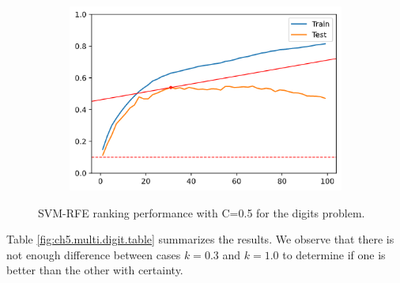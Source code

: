 \begin{figure}[h]
\begin{subfigure}[b]{0.4\linewidth}
    \end{subfigure}
    \begin{subfigure}[b]{0.4\linewidth}
        \includegraphics[width=\linewidth]{img/ch5/multi/w-coef.png}
    \end{subfigure}
    \caption[Multi-class criteria: Digits comparison]{SVM-RFE ranking performance with C=0.5 for the digits problem.}
    \label{fig:ch5.multi.digit.plot}
\end{figure}

Table \ref{fig:ch5.multi.digit.table} summarizes the results. We observe that there is not enough difference between cases $k = 0.3$ and $k = 1.0$ to determine if one is better than the other with certainty. 

